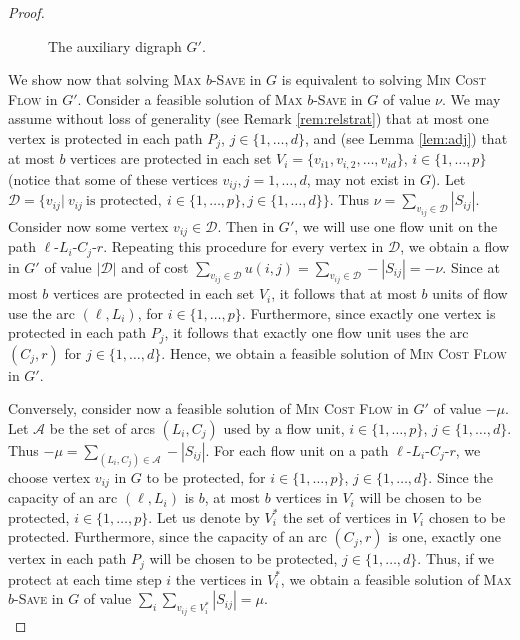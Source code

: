 \documentclass[10pt]{article}
\newcommand{\probtitle}[1]{\textsc{#1}}
\begin{document}
\begin{proof}
\begin{figure}[!h]
\caption{The auxiliary digraph $G'$.}
\label{fig:mincostflow}

\end{figure}

We show now that solving \probtitle{Max $b$-Save} in $G$ is equivalent to solving \probtitle{Min Cost Flow} in $G'$. Consider a feasible solution of \probtitle{Max $b$-Save} in $G$ of value $\nu$. We may assume without loss of generality (see Remark \ref{rem:relstrat}) that at most one vertex is protected in each path $P_j$, $j\in \{1,\ldots,d\}$, and (see Lemma \ref{lem:adj}) that at most $b$ vertices are protected in each set $V_i=\{v_{i1},v_{i,2},\ldots,v_{id}\}$, $i\in \{1,\ldots,p\}$ (notice that some of these vertices $v_{ij}, j=1,\ldots,d$, may not exist in $G$). Let $\mathcal{D}=\{v_{ij}|\ v_{ij}\ \mbox{is protected},\ i\in \{1,\ldots,p\}, j\in \{1,\ldots,d\}\}$. Thus $\nu=\sum_{v_{ij}\in \mathcal{D}}|S_{ij}|$. Consider now some vertex $v_{ij}\in \mathcal{D}$. Then in $G'$, we will use one flow unit on the path $\ell$-$L_i$-$C_j$-$r$. Repeating this procedure for every vertex in $\mathcal{D}$, we obtain a flow in $G'$ of value $|\mathcal{D}|$ and of cost $\sum_{v_{ij}\in\mathcal{D}}u(i,j)=\sum_{v_{ij}\in\mathcal{D}}-|S_{ij}|=-\nu$. Since at most $b$ vertices are protected in each set $V_i$, it follows that at most $b$ units of flow use the arc $(\ell,L_i)$, for $i\in \{1,\ldots,p\}$. Furthermore, since exactly one vertex is protected in each path $P_j$, it follows that exactly one flow unit uses the arc $(C_j,r)$ for $j\in\{1,\ldots,d\}$. Hence, we obtain a feasible solution of \probtitle{Min Cost Flow} in $G'$.

Conversely, consider now a feasible solution of \probtitle{Min Cost Flow} in $G'$ of value $-\mu$. Let $\mathcal{A}$ be the set of arcs $(L_i,C_j)$ used by a flow unit, $i\in \{1,\ldots,p\}$, $j\in \{1,\ldots,d\}$. Thus $-\mu=\sum_{(L_i,C_j)\in \mathcal{A}}-|S_{ij}|$. For each flow unit on a path $\ell$-$L_i$-$C_j$-$r$, we choose vertex $v_{ij}$ in $G$ to be protected, for $i\in \{1,\ldots,p\}$, $j\in \{1,\ldots,d\}$. Since the capacity of an arc $(\ell,L_i)$ is $b$, at most $b$ vertices in $V_i$ will be chosen to be protected, $i\in \{1,\ldots,p\}$. Let us denote by $V_{i}^{*}$ the set of vertices in $V_i$ chosen to be protected. Furthermore, since the capacity of an arc $(C_j,r)$ is one, exactly one vertex in each path $P_j$ will be chosen to be protected, $j\in \{1,\ldots,d\}$. Thus, if we protect at each time step $i$ the vertices in $V_{i}^{*}$, we obtain a feasible solution of \probtitle{Max $b$-Save} in $G$ of value $\sum_{i}\sum_{v_{ij}\in V_{i}^{*}}|S_{ij}|=\mu$.\\


\end{proof}
\end{document}
